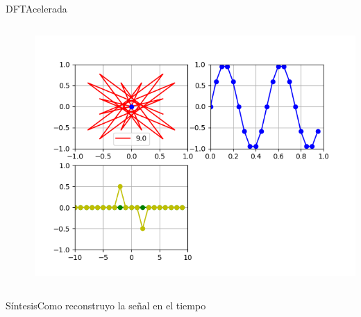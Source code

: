 \begin{frame}{DFT}{Acelerada}
   \handsonicon
   \begin{columns}[c]
      \hspace{2pt}
      \begin{column}{.3\textwidth}
         
      \end{column}
      \hspace{2pt}
      \vrule
      \hspace{2pt}
      \begin{column}{.3\textwidth}
         
      \end{column}
      \hspace{2pt}
      \vrule
      \hspace{2pt}
      \begin{column}{.4\textwidth}
         \centering\includegraphics[width=1.0\textwidth]{3_clase/euler5}
      \end{column}
      \hspace{2pt}
   \end{columns}
   \vfill
\end{frame}
\begin{frame}{Síntesis}{Como reconstruyo la señal en el tiempo}
   \handsonicon
   \begin{columns}[c]
      \hspace{2pt}
      \begin{column}{.5\textwidth}
         
      \end{column}
      \hspace{2pt}
      \vrule
      \hspace{2pt}
      \begin{column}{.5\textwidth}
         
      \end{column}
   \end{columns}
   \vfill
\end{frame}
